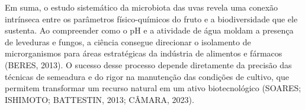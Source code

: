Em suma, o estudo sistemático da microbiota das uvas revela uma conexão intrínseca entre os parâmetros físico-químicos do fruto e a biodiversidade que ele sustenta. Ao compreender como o pH e a atividade de água moldam a presença de leveduras e fungos, a ciência consegue direcionar o isolamento de microrganismos para áreas estratégicas da indústria de alimentos e fármacos (BERES, 2013). O sucesso desse processo depende diretamente da precisão das técnicas de semeadura e do rigor na manutenção das condições de cultivo, que permitem transformar um recurso natural em um ativo biotecnológico (SOARES; ISHIMOTO; BATTESTIN, 2013; CÂMARA, 2023).
